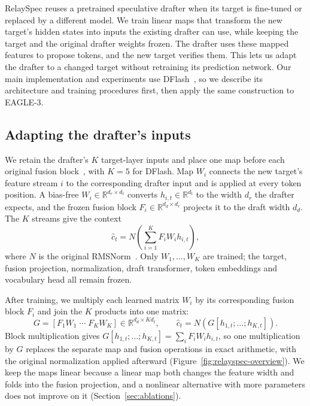 RelaySpec reuses a pretrained speculative drafter when its target is fine-tuned or replaced by a different model. We train linear maps that transform the new target's hidden states into inputs the existing drafter can use, while keeping the target and the original drafter weights frozen. The drafter uses these mapped features to propose tokens, and the new target verifies them. This lets us adapt the drafter to a changed target without retraining its prediction network. Our main implementation and experiments use DFlash~\citep{chen2026dflash}, so we describe its architecture and training procedures first, then apply the same construction to EAGLE-3.

\subsection{Adapting the drafter's inputs}
\label{sec:method-inputs}
We retain the drafter's $K$ target-layer inputs and place one map before each original fusion block~\citep{chen2026dflash}, with $K=5$ for DFlash. Map $W_i$ connects the new target's feature stream $i$ to the corresponding drafter input and is applied at every token position. A bias-free $W_i\in\mathbb R^{d_r\times d_t}$ converts $h_{i,t}\in\mathbb R^{d_t}$ to the width $d_r$ the drafter expects, and the frozen fusion block $F_i\in\mathbb R^{d_d\times d_r}$ projects it to the draft width $d_d$. The $K$ streams give the context
\begin{equation}
 \widehat c_t=N\!\left(\sum_{i=1}^{K}F_i W_i h_{i,t}\right),
 \label{eq:mapped-context}
\end{equation}
where $N$ is the original RMSNorm~\citep{zhang2019rmsnorm}. Only $W_1,\ldots,W_K$ are trained; the target, fusion projection, normalization, draft transformer, token embeddings and vocabulary head all remain frozen.

After training, we multiply each learned matrix $W_i$ by its corresponding fusion block $F_i$ and join the $K$ products into one matrix:
\begin{equation}
 G=[F_1W_1\;\cdots\;F_KW_K]\in\mathbb R^{d_d\times Kd_t},
 \qquad \widehat c_t=N(G[h_{1,t};\ldots;h_{K,t}]).
 \label{eq:folded-fusion}
\end{equation}
Block multiplication gives $G[h_{1,t};\ldots;h_{K,t}]=\sum_i F_iW_ih_{i,t}$, so one multiplication by $G$ replaces the separate map and fusion operations in exact arithmetic, with the original normalization applied afterward (Figure~\ref{fig:relayspec-overview}). We keep the maps linear because a linear map both changes the feature width and folds into the fusion projection, and a nonlinear alternative with more parameters does not improve on it (Section~\ref{sec:ablations}).

